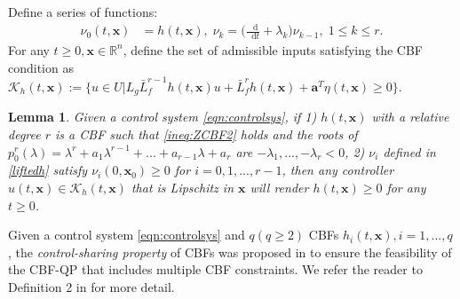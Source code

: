 \documentclass[journal,10pt]{IEEEtran}
\newtheorem{definition}{\bfseries Definition}%
\newtheorem{lemma}{\bfseries Lemma}%
\newcommand{\vect}[1]{\boldsymbol{\mathbf{#1}}}
\newcommand{\R}{\mathbb{R}}
\newcommand{\la}{\lambda}
\newcommand*\diff{\mathop{}\!\mathrm{d}}
\newif\ifdraft
\newcommand{\VF}[1]{\ifdraft{\color{blue}[{\bf VF}: #1]}\fi}
\begin{document}
Define a series of functions:%
\begin{align}\label{liftedh}
\nu_0(t,\vect{x})&=h(t,\vect{x}),\;\nu_{k}=\Big(\frac{\diff}{\diff t}+\la_k\Big)\nu_{k-1},\;1\le k\le r.
\end{align}
For any $t\geq 0,\vect{x}\in \R^n$, define the set of admissible inputs satisfying the CBF condition as $\mathcal{K}_h(t,\vect{x}):=\{u\in U|L_g\bar L_f^{r-1}h(t,\vect{x})u +\bar L_f^rh(t,\vect{x})+\vect{a}^T\eta(t,\vect{x}) \ge 0\}$. 

\begin{lemma}\cite{xu2018constrained}\label{thm:zcbf}
Given a control system \eqref{eqn:controlsys}, if 1) $h(t,\vect{x})$ with a relative degree $r$ is a CBF such that \eqref{ineq:ZCBF2} holds and the roots of $p_0^r(\la)=\la^r+a_1\la^{r-1}+...+a_{r-1}\la+a_r$ are  $-\la_1,...,-\la_r<0$, 2) $\nu_i$ defined in \eqref{liftedh} satisfy $\nu_i(0,\vect{x}_0)\ge 0$ for $i=0,1,...,r-1$, then any controller $u(t,\vect{x}) \in \mathcal{K}_h(t,\vect{x})$ that is Lipschitz in $\vect{x}$ will render $h(t,\vect{x})\ge 0$ for any $t\geq 0$.
\end{lemma}

Given a control system \eqref{eqn:controlsys} and $q (q\geq 2)$ CBFs $h_i(t,\vect{x}),i=1,...,q$, the \emph{control-sharing property} of CBFs was proposed in \cite{xu2018constrained} to ensure the feasibility of the CBF-QP that includes multiple CBF constraints. We refer the reader to Definition 2 in \cite{xu2018constrained} for more detail.
\end{document}
